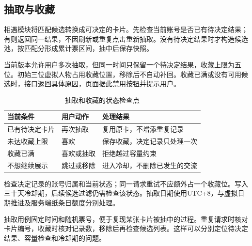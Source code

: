 \subsection*{抽取与收藏}
相遇模块将匹配候选转换成可决定的卡片。先检查当前账号是否已有待决定结果；有则返回同一结果，不因刷新或重复点击重新抽取。没有待决定结果时才构造候选池，按匹配分形成累计票区间，抽中后保存快照。

当前版本允许用户多次抽取，但同一时间只保留一个待决定结果，收藏上限为五位。初始三位虚拟人物占用收藏位置，移除后不自动补回。收藏已满或没有可用候选时，接口返回具体原因，页面据此禁用按钮并提示用户。

\begin{table}[H]\centering\small
\caption{抽取和收藏的状态检查点}
\begin{tabularx}{\linewidth}{@{}p{29mm}p{25mm}X@{}}\toprule
当前条件 & 用户动作 & 处理结果 \\ \midrule
已有待决定卡片 & 再次抽取 & 复用原卡，不增添重复记录 \\
未达收藏上限 & 喜欢 & 保存收藏，决定记录只处理一次 \\
收藏已满 & 喜欢或抽取 & 拒绝越过容量约束 \\
不想继续展示 & 跳过或移除 & 进入冷却，不删除已发生的交流 \\ \bottomrule
\end{tabularx}\end{table}

检查决定记录的账号归属和当前状态；同一请求重试不应额外占一个收藏位。写入三十天冷却期，后续候选过滤仍需检查该状态。抽取日期使用UTC+8，与虚拟日期推进及服务端纸条日额度分别处理。

抽取用例固定时间和随机票号，便于复现某张卡片被抽中的过程。重复请求时核对卡片编号，收藏时核对记录数，移除后再检查候选列表。这样可以分别定位待决定结果、容量检查和冷却期的问题。
